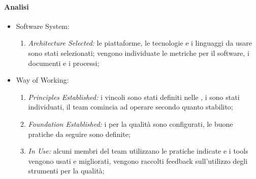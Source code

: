    	\paragraph{Analisi}
    	\begin{itemize}
    		\item Software System:
    			\begin{enumerate}
    				\item \emph{Architecture Selected:} le piattaforme, le tecnologie e i linguaggi da usare sono stati selezionati; vengono individuate le metriche per il software, i documenti e i processi;
    			\end{enumerate}
    		\item Way of Working:
    			\begin{enumerate}
    				\item \emph{Principles Established:} i vincoli sono stati definiti nelle \NormeDiProgetto, i  sono stati individuati, il team comincia ad operare secondo quanto stabilito;
    				\item \emph{Foundation Established:} i  per la qualità sono configurati, le buone pratiche da seguire sono definite;
    				\item \emph{In Use:} alcuni membri del team utilizzano le pratiche indicate e i tools vengono usati e migliorati, vengono raccolti feedback sull'utilizzo degli strumenti per la qualità;
    			\end{enumerate}
    	\end{itemize}
    	
